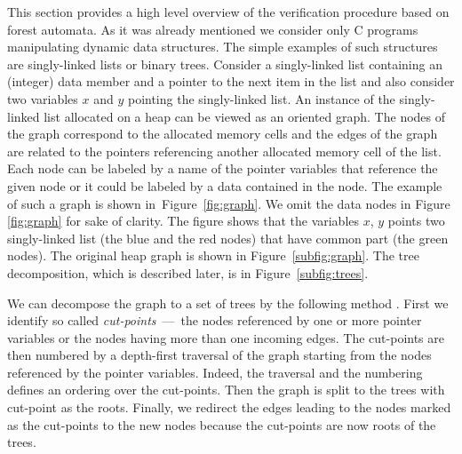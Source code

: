 \documentclass[fleqn,11pt]{ExcelAtFIT} %
\begin{document}
This section provides a high level overview of the verification procedure based
on forest automata.
As it was already mentioned we consider only C programs manipulating dynamic data structures.
The simple examples of such structures are singly-linked lists or binary trees.
Consider a singly-linked list containing an (integer) data member and a pointer
to the next item in the list and also
consider two variables $x$ and $y$ pointing the singly-linked list.
An instance of the singly-linked list allocated on a heap can be viewed as an oriented graph.
The nodes of the graph correspond to the allocated memory cells
and the edges of the graph are related to the pointers referencing
another allocated memory cell of the list.
Each node can be labeled by a name of the pointer variables that
reference the given node or it could be labeled by a data contained in the node.
The example of such a graph is shown in~Figure~\ref{fig:graph}.
We omit the data nodes in Figure \ref{fig:graph} for sake of clarity.
The figure shows that the variables $x$, $y$ points two singly-linked list (the blue and the red nodes) that
have common part (the green nodes).
The original heap graph is shown in Figure~\ref{subfig:graph}.
The tree decomposition, which is described later, is in Figure~\ref{subfig:trees}.

We can decompose the graph to a set of trees by the following method \cite{forester11}.
First we identify so called \emph{cut-points} \,---\, the nodes referenced by
one or more pointer variables or the nodes having more than one incoming edges.
The cut-points are then numbered by a depth-first traversal of the graph starting from
the nodes referenced by the pointer variables.
Indeed, the traversal and the numbering defines an ordering over the cut-points.
Then the graph is split to the trees with cut-point as the roots.
Finally, we redirect the edges leading to the nodes marked as the cut-points to the new nodes because the cut-points are now roots of the trees.
\end{document}
